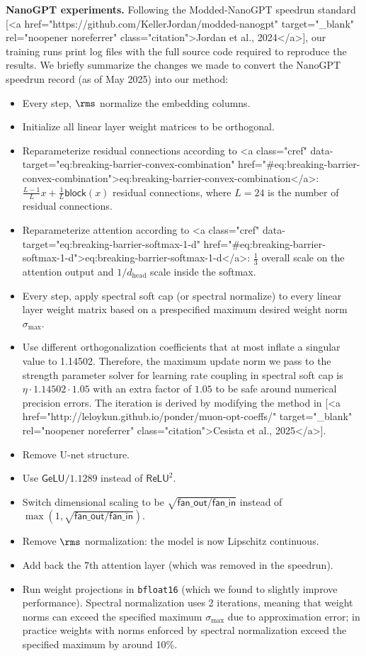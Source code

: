 \textbf{NanoGPT experiments.} Following the Modded-NanoGPT speedrun standard [<a href="https://github.com/KellerJordan/modded-nanogpt" target="_blank" rel="noopener noreferrer" class="citation">Jordan et al., 2024</a>], our training runs print log files with the full source code required to reproduce the results. We briefly summarize the changes we made to convert the NanoGPT speedrun record (as of May 2025) into our method:
\begin{itemize}
    \item Every step, $\rms$ normalize the embedding columns.
    \item Initialize all linear layer weight matrices to be orthogonal.
    \item Reparameterize residual connections according to <a class="cref" data-target="eq:breaking-barrier-convex-combination" href="#eq:breaking-barrier-convex-combination">eq:breaking-barrier-convex-combination</a>: $\tfrac{L-1}{L} x + \tfrac{1}{L} \mathsf{block}(x)$ residual connections, where $L = 24$ is the number of residual connections.
    \item Reparameterize attention according to <a class="cref" data-target="eq:breaking-barrier-softmax-1-d" href="#eq:breaking-barrier-softmax-1-d">eq:breaking-barrier-softmax-1-d</a>: $\tfrac13$ overall scale on the attention output and $1/d_\text{head}$ scale inside the softmax.
    \item Every step, apply spectral soft cap (or spectral normalize) to every linear layer weight matrix based on a prespecified maximum desired weight norm $\sigma_\text{max}$.
    \item Use different orthogonalization coefficients that at most inflate a singular value to 1.14502. Therefore, the maximum update norm we pass to the strength parameter solver for learning rate coupling in spectral soft cap is $\eta \cdot 1.14502 \cdot 1.05$ with an extra factor of $1.05$ to be safe around numerical precision errors. The iteration is derived by modifying the method in [<a href="http://leloykun.github.io/ponder/muon-opt-coeffs/" target="_blank" rel="noopener noreferrer" class="citation">Cesista et al., 2025</a>].
    \item Remove U-net structure.
    \item Use $\mathsf{GeLU} / 1.1289$ instead of $\mathsf{ReLU}^2$.
    \item Switch dimensional scaling to be $\sqrt{\mathsf{fan\_{out}} / \mathsf{fan\_{in}}}$ instead of $\max(1, \sqrt{\mathsf{fan\_out} / \mathsf{fan\_in}})$.
    \item Remove $\rms$ normalization: the model is now Lipschitz continuous.
    \item Add back the 7th attention layer (which was removed in the speedrun).
    \item Run weight projections in \verb|bfloat16| (which we found to slightly improve performance). Spectral normalization uses 2 iterations, meaning that weight norms can exceed the specified maximum $\sigma_\text{max}$ due to approximation error; in practice weights with norms enforced by spectral normalization exceed the specified maximum by around 10\%.
\end{itemize}